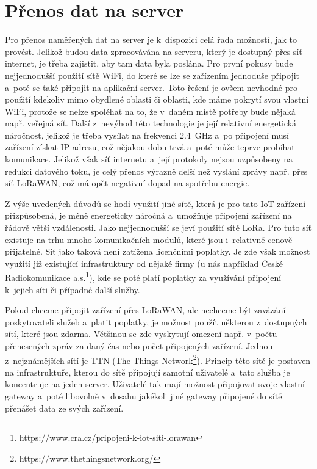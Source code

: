 \section{Přenos dat na server}

Pro přenos naměřených dat na server je k~dispozici celá řada možností, jak to provést. Jelikož budou data zpracovávána na serveru, který je dostupný přes síť internet, je třeba zajistit, aby tam data byla poslána. Pro první pokusy bude nejjednodušší použití sítě WiFi, do které se lze se zařízením jednoduše připojit a~poté se také připojit na aplikační server. Toto řešení je ovšem nevhodné pro použití kdekoliv mimo obydlené oblasti či oblasti, kde máme pokrytí svou vlastní WiFi, protože se nelze spoléhat na to, že v~daném místě potřeby bude nějaká např. veřejná síť. Další z~nevýhod této technologie je její relativní energetická náročnost, jelikož je třeba vysílat na frekvenci \SI{2,4}{\giga\hertz} a~po připojení musí zařízení získat IP adresu, což nějakou dobu trvá a~poté může teprve probíhat komunikace. Jelikož však síť internetu a~její protokoly nejsou uzpůsobeny na redukci datového toku, je celý přenos výrazně delší než vyslání zprávy např. přes síť LoRaWAN, což má opět negativní dopad na spotřebu energie.

Z výše uvedených důvodů se hodí využití jiné sítě, která je pro tato IoT zařízení přizpůsobená, je méně energeticky náročná a~umožňuje připojení zařízení na řádově větší vzdálenosti. Jako nejjednodušší se jeví použití sítě LoRa. Pro tuto síť existuje na trhu mnoho komunikačních modulů, které jsou i~relativně cenově přijatelné. Síť jako taková není zatížena licenčními poplatky. Je zde však možnost využití již existující infrastruktury od nějaké firmy (u nás například České Radiokomunikace a.s.\footnote{https://www.cra.cz/pripojeni-k-iot-siti-lorawan}), kde se poté platí poplatky za využívání připojení k~jejich síti či případné další služby.

Pokud chceme připojit zařízení přes LoRaWAN, ale nechceme být zavázání poskytovateli služeb a~platit poplatky, je možnost použít některou z~dostupných sítí, které jsou zdarma. Většinou se zde vyskytují omezení např. v~počtu přenesených zpráv za daný čas nebo počet připojených zařízení. Jednou z~nejznámějších sítí je TTN (The Things Network\footnote{https://www.thethingsnetwork.org/}). Princip této sítě je postaven na infrastruktuře, kterou do sítě připojují samotní uživatelé a~tato služba je koncentruje na jeden server. Uživatelé tak mají možnost připojovat svoje vlastní gateway a~poté libovolně v~dosahu jakékoli jiné gateway připojené do sítě přenášet data ze svých zařízení.

